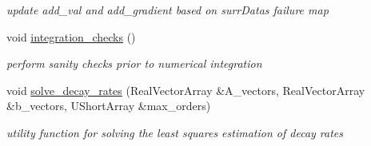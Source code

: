\begin{DoxyCompactItemize}
\begin{DoxyCompactList}\small\item\em update add\+\_\+val and add\+\_\+gradient based on surr\+Data\textquotesingle{}s failure map \end{DoxyCompactList}\item 
void \hyperlink{classPecos_1_1OrthogPolyApproximation_a058505591316662aceef75a581e99db1}{integration\+\_\+checks} ()\label{classPecos_1_1OrthogPolyApproximation_a058505591316662aceef75a581e99db1}

\begin{DoxyCompactList}\small\item\em perform sanity checks prior to numerical integration \end{DoxyCompactList}\item 
void \hyperlink{classPecos_1_1OrthogPolyApproximation_ac321b5b2615931ac6032fc11521f58dd}{solve\+\_\+decay\+\_\+rates} (Real\+Vector\+Array \&A\+\_\+vectors, Real\+Vector\+Array \&b\+\_\+vectors, U\+Short\+Array \&max\+\_\+orders)\label{classPecos_1_1OrthogPolyApproximation_ac321b5b2615931ac6032fc11521f58dd}

\begin{DoxyCompactList}\small\item\em utility function for solving the least squares estimation of decay rates \end{DoxyCompactList}\end{DoxyCompactItemize}
